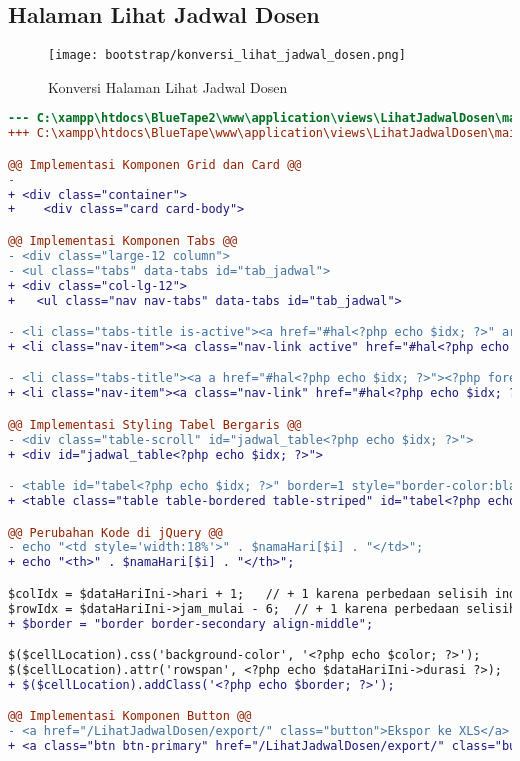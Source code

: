 \subsection{Halaman	Lihat Jadwal Dosen}
\begin{figure} [H]
	\centering  
	\texttt{[image: bootstrap/konversi\_lihat\_jadwal\_dosen.png]}
	\caption{Konversi Halaman	Lihat Jadwal Dosen}
\end{figure}
\begin{lstlisting}[language=diff, caption=Kode untuk Halaman Lihat Jadwal Dosen, label=Entri, basicstyle=\ttfamily, frame=single,
columns=fullflexible, keepspaces=true, breaklines=true]
--- C:\xampp\htdocs\BlueTape2\www\application\views\LihatJadwalDosen\main.php
+++ C:\xampp\htdocs\BlueTape\www\application\views\LihatJadwalDosen\main.php

@@ Implementasi Komponen Grid dan Card @@
-
+ <div class="container">
+    <div class="card card-body">

@@ Implementasi Komponen Tabs @@
- <div class="large-12 column">
- <ul class="tabs" data-tabs id="tab_jadwal">
+ <div class="col-lg-12">
+	<ul class="nav nav-tabs" data-tabs id="tab_jadwal">

- <li class="tabs-title is-active"><a href="#hal<?php echo $idx; ?>" aria-selected="true"><?php foreach ($currRow as $data) {
+ <li class="nav-item"><a class="nav-link active" href="#hal<?php echo $idx; ?>" 

- <li class="tabs-title"><a a href="#hal<?php echo $idx; ?>"><?php foreach ($currRow as $data) {
+ <li class="nav-item"><a class="nav-link" href="#hal<?php echo $idx; ?>"><?php foreach ($currRow as $data) {

@@ Implementasi Styling Tabel Bergaris @@
- <div class="table-scroll" id="jadwal_table<?php echo $idx; ?>">
+ <div id="jadwal_table<?php echo $idx; ?>">

- <table id="tabel<?php echo $idx; ?>" border=1 style="border-color:black ; border-collapse:separate">
+ <table class="table table-bordered table-striped" id="tabel<?php echo $idx; ?>" >

@@ Perubahan Kode di jQuery @@
- echo "<td style='width:18%'>" . $namaHari[$i] . "</td>";
+ echo "<th>" . $namaHari[$i] . "</th>";

$colIdx = $dataHariIni->hari + 1;   // + 1 karena perbedaan selisih index tabel dan value hari di database 
$rowIdx = $dataHariIni->jam_mulai - 6;  // + 1 karena perbedaan selisih index tabel dan value jam_mulai di database 
+ $border = "border border-secondary align-middle";

$($cellLocation).css('background-color', '<?php echo $color; ?>');
$($cellLocation).attr('rowspan', <?php echo $dataHariIni->durasi ?>);
+ $($cellLocation).addClass('<?php echo $border; ?>');

@@ Implementasi Komponen Button @@
- <a href="/LihatJadwalDosen/export/" class="button">Ekspor ke XLS</a>
+ <a class="btn btn-primary" href="/LihatJadwalDosen/export/" class="button">Ekspor ke XLS</a>
\end{lstlisting}
